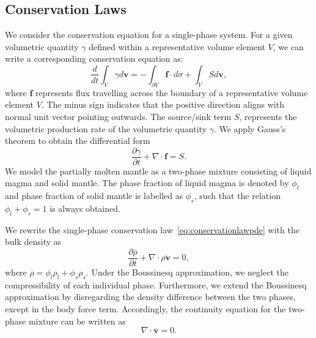 \subsection{Conservation Laws}
We consider the conservation equation for a single-phase system. 
For a given volumetric quantity $\gamma$ defined within 
a representative volume element $V$,
we can write a corresponding conservation equation as:
\begin{equation}\label{eq:generalconservationlaw}
		  \frac{d}{dt} \int_{V} \gamma d\mathbf{v} = 
		  - \int_{\partial V} \mathbf{f} \cdot d\sigma + \int_{V} S d\mathbf{v},
\end{equation}
where $\mathbf{f}$ represents flux travelling across the boundary of a representative 
volume element $V$. The minus sign indicates that the positive direction aligns with
normal unit vector pointing outwards. The source/sink term $S$, represents the volumetric
production rate of the volumetric quantity $\gamma$.
We apply Gauss's theorem to obtain the differential form
\begin{equation}\label{eq:conservationlawpde}
\frac{\partial \gamma}{\partial t} + \nabla \cdot \mathbf{f} = S.
\end{equation}
We model the partially molten mantle as a two-phase mixture consisting of liquid magma
and solid mantle. The phase fraction of liquid magma is denoted by $\phi_l$ and phase
fraction of solid mantle is labelled as $\phi_s$, such that the relation $\phi_l + \phi_s = 1$ is
always obtained.

We rewrite the single-phase conservation law~\eqref{eq:conservationlawpde} 
with the bulk density as
\begin{equation}\label{eq:massconservation}
\frac{\partial \overline{\rho}}{\partial t} + \nabla \cdot \overline{\rho \mathbf{v}} = 0,
\end{equation}
where $\overline{\rho} = \phi_l \rho_l + \phi_s \rho_s$.
Under the Boussinesq approximation, we neglect the compressibility of each 
individual phase. Furthermore, we extend the Boussinesq approximation 
by disregarding 
the density difference between the two phases, except in the body force term. 
Accordingly, the continuity equation for the two-phase mixture can be written as
\begin{equation}\label{eq:continuousfunction}
\nabla \cdot \overline{\mathbf{v}} = 0.
\end{equation}

